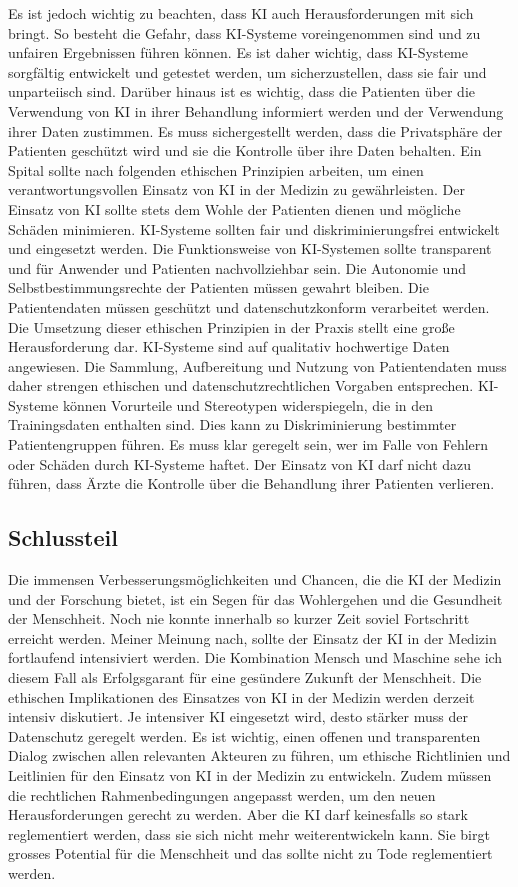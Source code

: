 \documentclass{article}
\begin{document}
Es ist jedoch wichtig zu beachten, dass KI auch Herausforderungen mit sich bringt. So besteht die Gefahr, dass KI-Systeme voreingenommen sind und zu unfairen Ergebnissen führen können. Es ist daher wichtig, dass KI-Systeme sorgfältig entwickelt und getestet werden, um sicherzustellen, dass sie fair und unparteiisch sind.
Darüber hinaus ist es wichtig, dass die Patienten über die Verwendung von KI in ihrer Behandlung informiert werden und der Verwendung ihrer Daten zustimmen. Es muss sichergestellt werden, dass die Privatsphäre der Patienten geschützt wird und sie die Kontrolle über ihre Daten behalten.
Ein Spital sollte nach folgenden ethischen Prinzipien arbeiten, um einen verantwortungsvollen Einsatz von KI in der Medizin zu gewährleisten.
 Der Einsatz von KI sollte stets dem Wohle der Patienten dienen und mögliche Schäden minimieren. KI-Systeme sollten fair und diskriminierungsfrei entwickelt und eingesetzt werden. Die Funktionsweise von KI-Systemen sollte transparent und für Anwender und Patienten nachvollziehbar sein. Die Autonomie und Selbstbestimmungsrechte der Patienten müssen gewahrt bleiben. Die Patientendaten müssen geschützt und datenschutzkonform verarbeitet werden.
Die Umsetzung dieser ethischen Prinzipien in der Praxis stellt eine große Herausforderung dar. KI-Systeme sind auf qualitativ hochwertige Daten angewiesen. Die Sammlung, Aufbereitung und Nutzung von Patientendaten muss daher strengen ethischen und datenschutzrechtlichen Vorgaben entsprechen.
 KI-Systeme können Vorurteile und Stereotypen widerspiegeln, die in den Trainingsdaten enthalten sind. Dies kann zu Diskriminierung bestimmter Patientengruppen führen.
Es muss klar geregelt sein, wer im Falle von Fehlern oder Schäden durch KI-Systeme haftet.
Der Einsatz von KI darf nicht dazu führen, dass Ärzte die Kontrolle über die Behandlung ihrer Patienten verlieren.

\subsection{Schlussteil}
Die immensen Verbesserungsmöglichkeiten und Chancen, die die KI der Medizin und der Forschung bietet, ist ein Segen für das Wohlergehen und die Gesundheit der Menschheit. Noch nie konnte innerhalb so kurzer Zeit soviel Fortschritt erreicht werden. Meiner Meinung nach, sollte der Einsatz der KI in der Medizin fortlaufend intensiviert werden. Die Kombination Mensch und Maschine sehe ich diesem Fall als Erfolgsgarant für eine gesündere Zukunft der Menschheit.
Die ethischen Implikationen des Einsatzes von KI in der Medizin werden derzeit intensiv diskutiert. Je intensiver KI eingesetzt wird, desto stärker muss der Datenschutz geregelt werden. Es ist wichtig, einen offenen und transparenten Dialog zwischen allen relevanten Akteuren zu führen, um ethische Richtlinien und Leitlinien für den Einsatz von KI in der Medizin zu entwickeln. Zudem müssen die rechtlichen Rahmenbedingungen angepasst werden, um den neuen Herausforderungen gerecht zu werden. Aber die KI darf keinesfalls so stark reglementiert werden, dass sie sich nicht mehr weiterentwickeln kann. Sie birgt grosses Potential für die Menschheit und das sollte nicht zu Tode reglementiert werden.



\nocite{*}
\printbibliography
\end{document}
